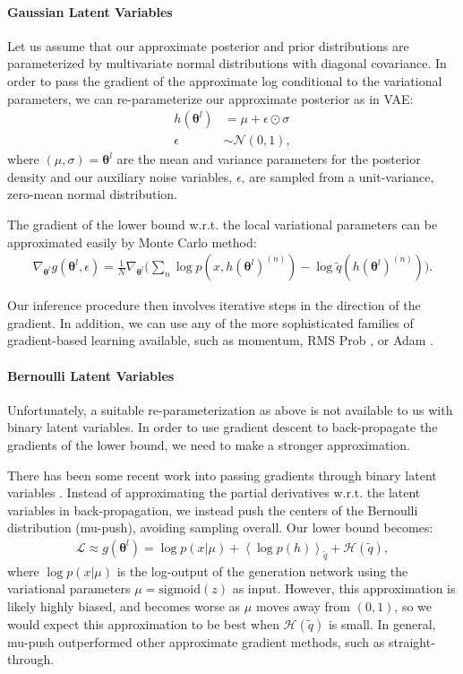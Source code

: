 \documentclass{article} %
\newcommand{\qexp}[1]{\left<#1\right>}
\newcommand{\vects}[1]{\boldsymbol{#1}}
\newcommand{\TT}[0]{\vects{\theta}}
\newcommand{\grad}[0]{\nabla}
\newcommand{\LL}[0]{\mathcal{L}}
\newcommand{\HH}[0]{\mathcal{H}}
\newcommand{\NN}[0]{\mathcal{N}}
\newcommand{\sigmoid}{\text{sigmoid}}
\begin{document}
\paragraph{Gaussian Latent Variables}

Let us assume that our approximate posterior and prior distributions are
parameterized by multivariate normal distributions with diagonal covariance. In
order to pass the gradient of the approximate log conditional to the variational
parameters, we can re-parameterize our approximate posterior as in VAE:
\begin{align}
h(\TT^l) &= \mu + \epsilon \odot \sigma \nonumber \\
\epsilon &\sim \NN(0, 1),
\end{align}
where $(\mu, \sigma) = \TT^l$ are the mean and variance parameters for the
posterior density and our auxiliary noise variables, $\epsilon$, are sampled
from a unit-variance, zero-mean normal distribution.

The gradient of the lower bound w.r.t. the local variational parameters can be
approximated easily by Monte Carlo method:
\begin{align}
\grad_{\TT^l} g(\TT^l, \epsilon) = \frac{1}{N} \grad_{\TT^l} \bigg(\sum_n \log p(x, h(\TT^l)^{(n)}) - \log \tilde{q}(h(\TT^l)^{(n)})\bigg).
\end{align}

Our inference procedure then involves iterative steps in the direction of the gradient. In addition, we can use any of the more sophisticated families of gradient-based learning available, such as momentum, RMS Prob \citep{Hinton-Coursera2012}, or Adam \citep{kingma2014method}.

\paragraph{Bernoulli Latent Variables}
Unfortunately, a suitable re-parameterization as above is not available to us
with binary latent variables. In order to use gradient descent to back-propagate
the gradients of the lower bound, we need to make a stronger approximation. 

There has been some recent work into passing gradients through binary latent
variables \citep{bengio2013estimating}. Instead of approximating the partial
derivatives w.r.t. the latent variables in back-propagation, we instead push the
centers of the Bernoulli distribution (mu-push), avoiding sampling overall. Our lower
bound becomes:
\begin{align}
     \LL \approx g(\TT^l) = \log p(x | \mu) + \qexp{\log p(h)}_{\tilde{q}} +
     \HH(\tilde{q}),
\end{align}
where $\log p(x | \mu)$ is the log-output of the generation network using the
variational parameters $\mu = \sigmoid(z)$ as input. However, this approximation
is likely highly biased, and becomes worse as $\mu$ moves away from $(0, 1)$, so
we would expect this approximation to be best when $\HH(\tilde{q})$ is small. In general, mu-push outperformed other approximate gradient methods, such as straight-through.
\end{document}
